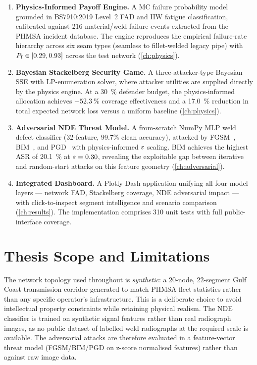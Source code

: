 \begin{enumerate}
  \item \textbf{Physics-Informed Payoff Engine.}  A \ac{MC} failure
    probability model grounded in \ac{BS7910}:2019 Level~2 \ac{FAD}
    and \acs{IIW} fatigue classification, calibrated against 216
    material/weld failure events extracted from the \ac{PHMSA} incident
    database.  The engine reproduces the empirical failure-rate hierarchy
    across six seam types (seamless to fillet-welded legacy pipe) with
    $P_{\mathrm{f}} \in [0.29, 0.93]$ across the test network
    (\cref{ch:physics}).

  \item \textbf{Bayesian Stackelberg Security Game.}  A three-attacker-type
    Bayesian \ac{SSE} with LP-enumeration solver, where attacker utilities
    are supplied directly by the physics engine.  At a \SI{30}{\percent}
    defender budget, the physics-informed allocation achieves
    $+\SI{52.3}{\percent}$ coverage effectiveness and a \SI{17.0}{\percent}
    reduction in total expected network loss versus a uniform baseline
    (\cref{ch:physics}).

  \item \textbf{Adversarial NDE Threat Model.}  A from-scratch NumPy
    \ac{MLP} weld defect classifier (32-feature, 99.7\% clean accuracy),
    attacked by \ac{FGSM}~\cite{Goodfellow2015},
    \ac{BIM}~\cite{Kurakin2017}, and \ac{PGD}~\cite{Madry2018} with
    physics-informed $\varepsilon$ scaling.  \ac{BIM} achieves the highest
    \ac{ASR} of \SI{20.1}{\percent} at $\varepsilon = 0.30$, revealing
    the exploitable gap between iterative and random-start attacks on this
    feature geometry (\cref{ch:adversarial}).

  \item \textbf{Integrated Dashboard.}  A Plotly Dash application unifying
    all four model layers — network \ac{FAD}, Stackelberg coverage, \ac{NDE}
    adversarial impact — with click-to-inspect segment intelligence and
    scenario comparison (\cref{ch:results}).  The implementation comprises
    310 unit tests with full public-interface coverage.
\end{enumerate}

\section{Thesis Scope and Limitations}
\label{sec:intro_scope}

The network topology used throughout is \emph{synthetic}: a 20-node,
22-segment Gulf Coast transmission corridor generated to match \ac{PHMSA}
fleet statistics rather than any specific operator's infrastructure.  This
is a deliberate choice to avoid intellectual property constraints while
retaining physical realism.  The \ac{NDE} classifier is trained on
synthetic signal features rather than real radiograph images, as no
public dataset of labelled weld radiographs at the required scale is
available.  The adversarial attacks are therefore evaluated in a
feature-vector threat model (\ac{FGSM}/\ac{BIM}/\ac{PGD} on z-score
normalised features) rather than against raw image data.

